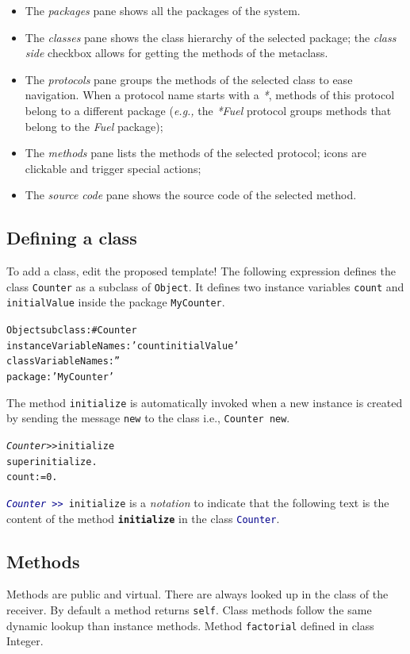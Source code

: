 \documentclass[notumble]{leaflet}
\makeatletter
\newcommand{\eg}{\emph{e.g.,}\xspace}
\newcommand{\ct}[1]{{\textsf{#1}}\xspace}
\newenvironment{displaycode}{%
     \par
     \hspace{1.5em}\begin{minipage}{\linewidth}
       \begin{alltt}\small}{
       \end{alltt}
     \end{minipage}
     \par}
\newcommand{\code}[1]{\foreignlanguage{english}{\texttt{#1}}}
\makeatother
\begin{document}
\begin{itemize}
\item The \emph{packages} pane shows all the packages of the system.
\item The \emph{classes} pane shows the class hierarchy of the
  selected package; the \emph{class side} checkbox allows for getting
  the methods of the metaclass.
\item The \emph{protocols} pane groups the methods of the selected
  class to ease navigation.  When a protocol name starts with a \emph{*}, methods of this
  protocol belong to a different package (\eg the \emph{*Fuel}
  protocol groups methods that belong to the \emph{Fuel} package);
\item The \emph{methods} pane lists the methods of the selected
  protocol; icons are clickable and trigger special actions;
\item The \emph{source code} pane shows the source code of the
  selected method. 
\end{itemize}


\subsection{Defining a class}
To add a class, edit the proposed template!
The following expression defines the class \code{Counter} as a subclass of \code{Object}.
It defines two instance variables \code{count} and \code{initialValue} inside the package \code{MyCounter}.

\begin{displaycode}
Object subclass: #Counter
   instanceVariableNames: 'count initialValue'
   classVariableNames: '' 
   package: 'MyCounter'
\end{displaycode}

The method \code{initialize} is automatically invoked when a new instance is created by sending the message \code{new} to the class i.e., \code{Counter new}.   

\begin{displaycode}
\textit{Counter >>} initialize 
    super initialize.
    count := 0. 
\end{displaycode}

\code{\textcolor{darkBlue}{\textit{Counter}\,>{}>\,}initialize} is a \textit{notation} to indicate that the following text is the content of the method \code{\textbf{initialize}} in the class \code{\textcolor{darkBlue}{Counter}}.

\subsection{Methods}
Methods are public and virtual. There are always looked up in the class of the receiver. By default a method returns \code{self}. 
Class methods follow the same dynamic lookup than instance methods. 
Method \code{factorial} defined in class \ct{Integer}. 
\end{document}
